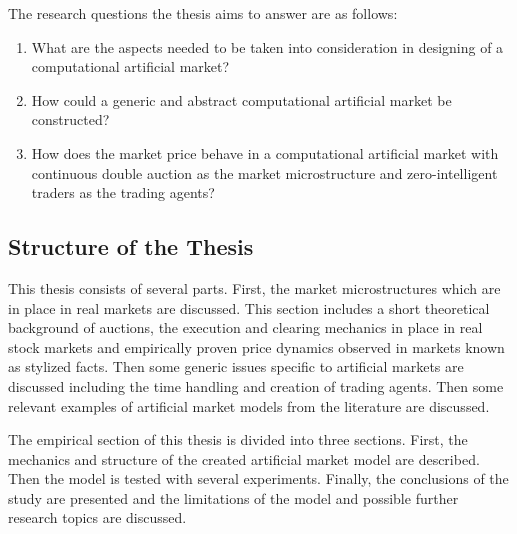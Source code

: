 The research questions the thesis aims to answer are as follows:
\begin{enumerate}
    \item What are the aspects needed to be taken into consideration in designing of a computational 
          artificial market?
	\item How could a generic and abstract computational artificial market be constructed?
    \item How does the market price behave in a computational artificial market with continuous
          double auction as the market microstructure and zero-intelligent traders as the 
          trading agents?
\end{enumerate}


\subsection{Structure of the Thesis}
This thesis consists of several parts. First, the market microstructures which are in place in real 
markets are discussed. This section includes a short theoretical background of auctions, the execution and clearing mechanics in place in real
stock markets and empirically proven price dynamics observed in markets known as stylized
facts. Then some generic issues specific to artificial markets are discussed including the time handling and creation
of trading agents. Then some relevant examples of artificial market models from the literature are discussed. 

The empirical section of this thesis is divided into three sections. First, the mechanics and
structure of the created artificial market model are described. Then the model is tested
with several experiments. Finally, the conclusions of the study are presented and the limitations of the model and
possible further research topics are discussed.